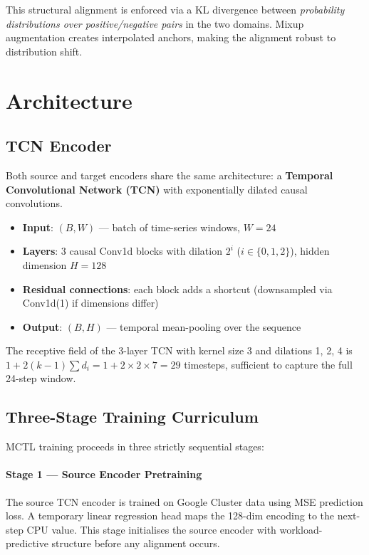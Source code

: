 \documentclass[12pt,a4paper]{article}
\begin{document}
This structural alignment is enforced via a KL divergence between
\emph{probability distributions over positive/negative pairs} in the two domains.
Mixup augmentation creates interpolated anchors, making the alignment robust to
distribution shift.

\section{Architecture}

\subsection{TCN Encoder}

Both source and target encoders share the same architecture: a
\textbf{Temporal Convolutional Network (TCN)} with exponentially dilated causal
convolutions.

\begin{itemize}
    \item \textbf{Input}: $(B, W)$ — batch of time-series windows, $W = 24$
    \item \textbf{Layers}: 3 causal Conv1d blocks with dilation $2^i$
    ($i \in \{0, 1, 2\}$), hidden dimension $H = 128$
    \item \textbf{Residual connections}: each block adds a shortcut
    (downsampled via Conv1d(1) if dimensions differ)
    \item \textbf{Output}: $(B, H)$ — temporal mean-pooling over the sequence
\end{itemize}

The receptive field of the 3-layer TCN with kernel size 3 and dilations 1, 2, 4
is $1 + 2(k-1)\sum d_i = 1 + 2 \times 2 \times 7 = 29$ timesteps, sufficient
to capture the full 24-step window.

\subsection{Three-Stage Training Curriculum}

MCTL training proceeds in three strictly sequential stages:

\paragraph{Stage 1 — Source Encoder Pretraining}
The source TCN encoder is trained on Google Cluster data using MSE prediction
loss.  A temporary linear regression head maps the 128-dim encoding to the
next-step CPU value.  This stage initialises the source encoder with
workload-predictive structure before any alignment occurs.
\end{document}
